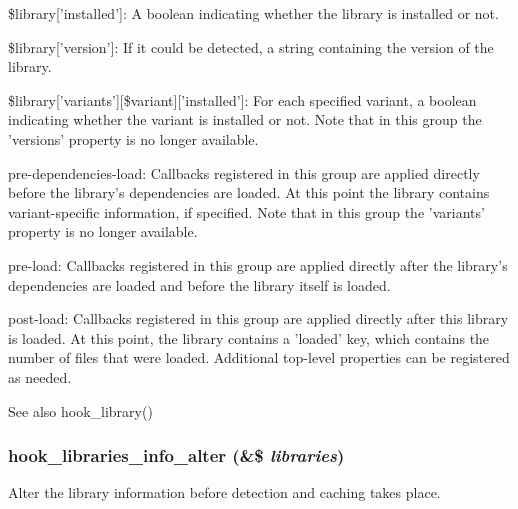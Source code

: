 \begin{DoxyItemize}
\begin{DoxyItemize}
\begin{DoxyItemize}
\item \$library\mbox{[}'installed'\mbox{]}: A boolean indicating whether the library is installed or not.
\item \$library\mbox{[}'version'\mbox{]}: If it could be detected, a string containing the version of the library.
\item \$library\mbox{[}'variants'\mbox{]}\mbox{[}\$variant\mbox{]}\mbox{[}'installed'\mbox{]}: For each specified variant, a boolean indicating whether the variant is installed or not. Note that in this group the 'versions' property is no longer available.
\end{DoxyItemize}
\item pre-\/dependencies-\/load: Callbacks registered in this group are applied directly before the library's dependencies are loaded. At this point the library contains variant-\/specific information, if specified. Note that in this group the 'variants' property is no longer available.
\item pre-\/load: Callbacks registered in this group are applied directly after the library's dependencies are loaded and before the library itself is loaded.
\item post-\/load: Callbacks registered in this group are applied directly after this library is loaded. At this point, the library contains a 'loaded' key, which contains the number of files that were loaded. Additional top-\/level properties can be registered as needed.
\end{DoxyItemize}
\end{DoxyItemize}

\begin{DoxySeeAlso}{See also}
hook\_\-library() 
\end{DoxySeeAlso}
\hypertarget{libraries_8api_8php_a6143e19206c3ddd8b4241306edf201a1}{
\subsubsection[{hook\_\-libraries\_\-info\_\-alter}]{\setlength{\rightskip}{0pt plus 5cm}hook\_\-libraries\_\-info\_\-alter (\&\$ {\em libraries})}}
\label{libraries_8api_8php_a6143e19206c3ddd8b4241306edf201a1}
Alter the library information before detection and caching takes place.

